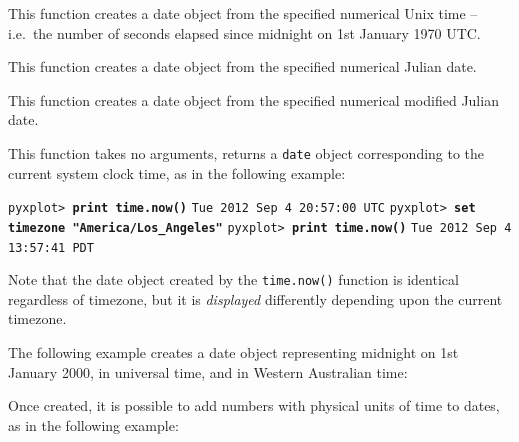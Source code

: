 \vspace{2mm}\vspace{2mm}

\noindent This function creates a date object from the specified numerical Unix time -- i.e.\ the number of seconds elapsed since midnight on 1st January 1970 UTC.

\vspace{2mm}\vspace{2mm}

\noindent This function creates a date object from the specified numerical
Julian date.

\vspace{2mm}\vspace{2mm}

\noindent This function creates a date object from the
specified numerical modified Julian date.

\vspace{2mm}\vspace{2mm}

This function takes no arguments, returns a {\tt date} object corresponding to
the current system clock time, as in the following example:

\vspace{3mm}
\noindent\texttt{pyxplot> \textbf{print time.now()}}\newline
\noindent\texttt{Tue 2012 Sep 4 20:57:00 UTC}\newline
\noindent\texttt{pyxplot> \textbf{set timezone "America/Los\_Angeles"}}\newline
\noindent\texttt{pyxplot> \textbf{print time.now()}}\newline
\noindent\texttt{Tue 2012 Sep 4 13:57:41 PDT}\newline
\vspace{3mm}

Note that the date object created by the {\tt time.now()} function is identical
regardless of timezone, but it is {\it displayed} differently depending upon
the current timezone.

The following example creates a date object representing midnight on 1st
January 2000, in universal time, and in Western Australian time:

\vspace{3mm}

\vspace{3mm}

Once created, it is possible to add numbers with physical units of time to
dates, as in the following example:

